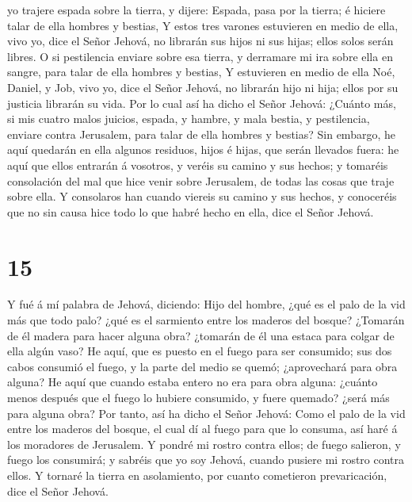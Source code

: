 yo trajere espada sobre la tierra, y dijere: Espada, pasa por la tierra;
é hiciere talar de ella hombres y bestias,  Y estos tres
varones estuvieren en medio de ella, vivo yo, dice el Señor Jehová, no
librarán sus hijos ni sus hijas; ellos solos serán libres. 
O si pestilencia enviare sobre esa tierra, y derramare mi ira sobre ella
en sangre, para talar de ella hombres y bestias,  Y
estuvieren en medio de ella Noé, Daniel, y Job, vivo yo, dice el Señor
Jehová, no librarán hijo ni hija; ellos por su justicia librarán su
vida.  Por lo cual así ha dicho el Señor Jehová: ¿Cuánto
más, si mis cuatro malos juicios, espada, y hambre, y mala bestia, y
pestilencia, enviare contra Jerusalem, para talar de ella hombres y
bestias?  Sin embargo, he aquí quedarán en ella algunos
residuos, hijos é hijas, que serán llevados fuera: he aquí que ellos
entrarán á vosotros, y veréis su camino y sus hechos; y tomaréis
consolación del mal que hice venir sobre Jerusalem, de todas las cosas
que traje sobre ella.  Y consolaros han cuando viereis su
camino y sus hechos, y conoceréis que no sin causa hice todo lo que
habré hecho en ella, dice el Señor Jehová.

\hypertarget{section-14}{%
\section{15}\label{section-14}}

 Y fué á mí palabra de Jehová, diciendo:  Hijo
del hombre, ¿qué es el palo de la vid más que todo palo? ¿qué es el
sarmiento entre los maderos del bosque?  ¿Tomarán de él
madera para hacer alguna obra? ¿tomarán de él una estaca para colgar de
ella algún vaso?  He aquí, que es puesto en el fuego para
ser consumido; sus dos cabos consumió el fuego, y la parte del medio se
quemó; ¿aprovechará para obra alguna?  He aquí que cuando
estaba entero no era para obra alguna: ¿cuánto menos después que el
fuego lo hubiere consumido, y fuere quemado? ¿será más para alguna obra?
 Por tanto, así ha dicho el Señor Jehová: Como el palo de la
vid entre los maderos del bosque, el cual dí al fuego para que lo
consuma, así haré á los moradores de Jerusalem.  Y pondré mi
rostro contra ellos; de fuego salieron, y fuego los consumirá; y sabréis
que yo soy Jehová, cuando pusiere mi rostro contra ellos.  Y
tornaré la tierra en asolamiento, por cuanto cometieron prevaricación,
dice el Señor Jehová.

